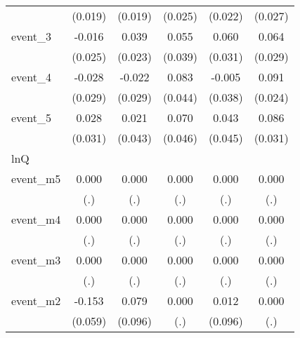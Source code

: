 {\begin{tabular}{l*{5}{c}}
            &     (0.019)         &     (0.019)         &     (0.025)         &     (0.022)         &     (0.027)         \\
[1em]
event\_3     &      -0.016         &       0.039         &       0.055         &       0.060         &       0.064\sym{*}  \\
            &     (0.025)         &     (0.023)         &     (0.039)         &     (0.031)         &     (0.029)         \\
[1em]
event\_4     &      -0.028         &      -0.022         &       0.083         &      -0.005         &       0.091\sym{***}\\
            &     (0.029)         &     (0.029)         &     (0.044)         &     (0.038)         &     (0.024)         \\
[1em]
event\_5     &       0.028         &       0.021         &       0.070         &       0.043         &       0.086\sym{**} \\
            &     (0.031)         &     (0.043)         &     (0.046)         &     (0.045)         &     (0.031)         \\
\hline
lnQ         &                     &                     &                     &                     &                     \\
event\_m5    &       0.000         &       0.000         &       0.000         &       0.000         &       0.000         \\
            &         (.)         &         (.)         &         (.)         &         (.)         &         (.)         \\
[1em]
event\_m4    &       0.000         &       0.000         &       0.000         &       0.000         &       0.000         \\
            &         (.)         &         (.)         &         (.)         &         (.)         &         (.)         \\
[1em]
event\_m3    &       0.000         &       0.000         &       0.000         &       0.000         &       0.000         \\
            &         (.)         &         (.)         &         (.)         &         (.)         &         (.)         \\
[1em]
event\_m2    &      -0.153\sym{**} &       0.079         &       0.000         &       0.012         &       0.000         \\
            &     (0.059)         &     (0.096)         &         (.)         &     (0.096)         &         (.)         \\

\end{tabular}}

